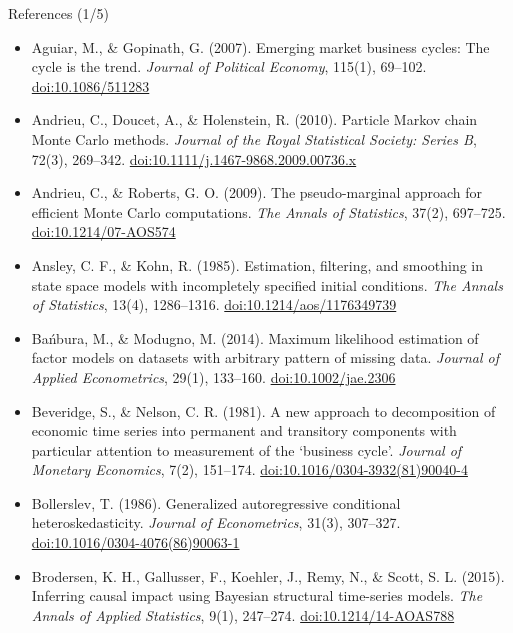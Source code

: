\begin{frame}{References (1/5)}
\itemsize{\tiny}
\begin{itemize}
    \item Aguiar, M., \& Gopinath, G. (2007). Emerging market business cycles: The cycle is the trend. \textit{Journal of Political Economy}, 115(1), 69--102. \href{https://doi.org/10.1086/511283}{doi:10.1086/511283}
    \item Andrieu, C., Doucet, A., \& Holenstein, R. (2010). Particle Markov chain Monte Carlo methods. \textit{Journal of the Royal Statistical Society: Series B}, 72(3), 269--342. \href{https://doi.org/10.1111/j.1467-9868.2009.00736.x}{doi:10.1111/j.1467-9868.2009.00736.x}
    \item Andrieu, C., \& Roberts, G. O. (2009). The pseudo-marginal approach for efficient Monte Carlo computations. \textit{The Annals of Statistics}, 37(2), 697--725. \href{https://doi.org/10.1214/07-AOS574}{doi:10.1214/07-AOS574}
    \item Ansley, C. F., \& Kohn, R. (1985). Estimation, filtering, and smoothing in state space models with incompletely specified initial conditions. \textit{The Annals of Statistics}, 13(4), 1286--1316. \href{https://doi.org/10.1214/aos/1176349739}{doi:10.1214/aos/1176349739}
    \item Bańbura, M., \& Modugno, M. (2014). Maximum likelihood estimation of factor models on datasets with arbitrary pattern of missing data. \textit{Journal of Applied Econometrics}, 29(1), 133--160. \href{https://doi.org/10.1002/jae.2306}{doi:10.1002/jae.2306}
    \item Beveridge, S., \& Nelson, C. R. (1981). A new approach to decomposition of economic time series into permanent and transitory components with particular attention to measurement of the `business cycle'. \textit{Journal of Monetary Economics}, 7(2), 151--174. \href{https://doi.org/10.1016/0304-3932(81)90040-4}{doi:10.1016/0304-3932(81)90040-4}
    \item Bollerslev, T. (1986). Generalized autoregressive conditional heteroskedasticity. \textit{Journal of Econometrics}, 31(3), 307--327. \href{https://doi.org/10.1016/0304-4076(86)90063-1}{doi:10.1016/0304-4076(86)90063-1}
    \item Brodersen, K. H., Gallusser, F., Koehler, J., Remy, N., \& Scott, S. L. (2015). Inferring causal impact using Bayesian structural time-series models. \textit{The Annals of Applied Statistics}, 9(1), 247--274. \href{https://doi.org/10.1214/14-AOAS788}{doi:10.1214/14-AOAS788}

\end{itemize}
\end{frame}
